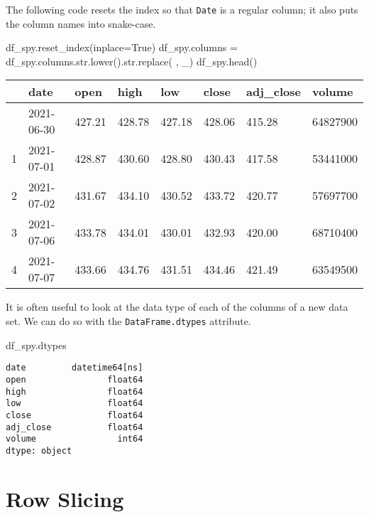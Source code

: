 \documentclass[
  letterpaper,
  DIV=11,
  numbers=noendperiod]{scrreprt}
\newenvironment{Shaded}{\begin{snugshade}}{\end{snugshade}}
\newcommand{\BuiltInTok}[1]{\textcolor[rgb]{0.00,0.23,0.31}{#1}}
\newcommand{\NormalTok}[1]{\textcolor[rgb]{0.00,0.23,0.31}{#1}}
\newcommand{\OperatorTok}[1]{\textcolor[rgb]{0.37,0.37,0.37}{#1}}
\newcommand{\StringTok}[1]{\textcolor[rgb]{0.13,0.47,0.30}{#1}}
\newcommand{\VariableTok}[1]{\textcolor[rgb]{0.07,0.07,0.07}{#1}}
\begin{document}
The following code resets the index so that \texttt{Date} is a regular
column; it also puts the column names into snake-case.

\begin{Shaded}
\begin{Highlighting}[]
\NormalTok{df\_spy.reset\_index(inplace}\OperatorTok{=}\VariableTok{True}\NormalTok{)}
\NormalTok{df\_spy.columns }\OperatorTok{=}\NormalTok{ df\_spy.columns.}\BuiltInTok{str}\NormalTok{.lower().}\BuiltInTok{str}\NormalTok{.replace(}\StringTok{\textquotesingle{} \textquotesingle{}}\NormalTok{, }\StringTok{\textquotesingle{}\_\textquotesingle{}}\NormalTok{)}
\NormalTok{df\_spy.head()}
\end{Highlighting}
\end{Shaded}

\begin{longtable}[]{@{}llllllll@{}}
\toprule\noalign{}
& date & open & high & low & close & adj\_close & volume \\
\midrule\noalign{}
\endhead
\bottomrule\noalign{}
\endlastfoot
0 & 2021-06-30 & 427.21 & 428.78 & 427.18 & 428.06 & 415.28 &
64827900 \\
1 & 2021-07-01 & 428.87 & 430.60 & 428.80 & 430.43 & 417.58 &
53441000 \\
2 & 2021-07-02 & 431.67 & 434.10 & 430.52 & 433.72 & 420.77 &
57697700 \\
3 & 2021-07-06 & 433.78 & 434.01 & 430.01 & 432.93 & 420.00 &
68710400 \\
4 & 2021-07-07 & 433.66 & 434.76 & 431.51 & 434.46 & 421.49 &
63549500 \\
\end{longtable}

It is often useful to look at the data type of each of the columns of a
new data set. We can do so with the \texttt{DataFrame.dtypes} attribute.

\begin{Shaded}
\begin{Highlighting}[]
\NormalTok{df\_spy.dtypes}
\end{Highlighting}
\end{Shaded}

\begin{verbatim}
date         datetime64[ns]
open                float64
high                float64
low                 float64
close               float64
adj_close           float64
volume                int64
dtype: object
\end{verbatim}

\hypertarget{row-slicing}{%
\section{Row Slicing}\label{row-slicing}}
\end{document}
